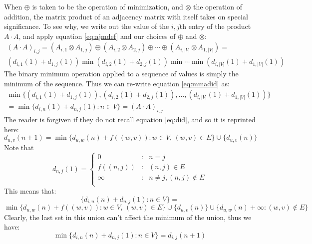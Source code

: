 \documentclass[12pt,twoside]{reedthesis}
\begin{document}
When $\oplus$ is taken to be the operation of minimization, and $\otimes$ the operation of addition, the matrix product of an adjacency matrix with itself takes on special significance. To see why, we write out the value of the $i,j$th entry of the product $A \cdot A$, and apply equation \ref{eq:ajmdef} and our choices of $\oplus$ and $\otimes$:
\begin{equation}
\begin{array}{c}
(A \cdot A)_{i,j} = (A_{i,1} \otimes A_{1,j}) \oplus (A_{i,2} \otimes A_{2,j}) \oplus \cdots \oplus (A_{i,|V|} \otimes A_{1,|V|}) = \\
\label{eq:mmadid}
(d_{i,1}(1) + d_{1,j}(1)) \min (d_{i,2}(1) + d_{2,j}(1)) \min \cdots \min (d_{i,|V|}(1) + d_{1,|V|}(1))
\end{array}
\end{equation}
The binary minimum operation applied to a sequence of values is simply the minimum of the sequence. Thus we can re-write equation \ref{eq:mmadid} as:
\begin{equation}
\begin{array}{c}
\label{eq:fmmid}
\min \{ (d_{i,1}(1) + d_{1,j}(1)), (d_{i,2}(1) + d_{2,j}(1)),\ldots, (d_{i,|V|}(1) + d_{1,|V|}(1)) \}  \\
= \min \{d_{i,n}(1) + d_{n,j}(1) : n \in V \} = (A \cdot A)_{i,j} 
\end{array}
\end{equation}
The reader is forgiven if they do not recall equation \ref{eq:did}, and so it is reprinted here:
$$
d_{u,v}(n+1) = \min \{d_{u,w}(n) + f((w,v)) : w \in V, \, (w,v) \in E \} \cup \{d_{u,v}(n)\}
$$
Note that 
\begin{displaymath}
   d_{n,j}(1) = \left\{
     \begin{array}{lcl}
       0 & : &n = j \\
       f((n,j)) & : &(n,j) \in E \\
       \infty & : &n \neq j, (n,j) \not \in E \\
     \end{array}
   \right.
\end{displaymath}
This means that:
$$
\{d_{i,n}(n) + d_{n,j}(1) : n \in V \} =
$$
$$
\min \{d_{u,w}(n) + f((w,v)) : w \in V, \, (w,v) \in E \} \cup \{d_{u,v}(n)\} \cup \{d_{u,w}(n) + \infty :  (w,v) \not \in E\}
$$
Clearly, the last set in this union can't affect the minimum of the union, thus we have:
\begin{equation}
\label{yes}
\min\{d_{i,n}(n) + d_{n,j}(1) : n \in V \} = d_{i,j}(n+1)
\end{equation}
\end{document}
